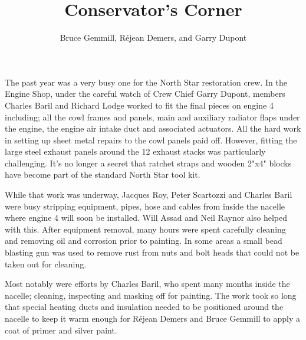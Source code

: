 %


\title{Conservator's Corner}
\author{Bruce Gemmill, R\'{e}jean Demers, and Garry Dupont}

\maketitle


The past year was a very busy one for the North Star restoration crew. 
In the Engine Shop, under the careful watch of Crew Chief Garry Dupont,
members Charles Baril and Richard Lodge worked to fit the final pieces
on engine 4 including; all the cowl frames and panels, main and
auxiliary radiator flaps under the engine, the engine air intake duct
and associated actuators. All the hard work in setting up sheet metal
repairs to the cowl panels paid off.  However, fitting the large steel
exhaust panels around the 12 exhaust stacks was particularly
challenging. It's no longer a secret that ratchet straps and wooden
2"x4" blocks have become part of the standard North Star tool kit.

While that work was underway, Jacques Roy, Peter Scartozzi and Charles
Baril were busy stripping equipment, pipes, hose and cables from inside
the nacelle where engine 4 will soon be installed.  Will Assad and Neil
Raynor also helped with this. After equipment removal, many hours were
spent carefully cleaning and removing oil and corrosion prior to
painting.  In some areas a small bead blasting gun was used to remove
rust from nuts and bolt heads that could not be taken out for cleaning.

Most notably were efforts by Charles Baril, who spent many months
inside the nacelle; cleaning, inspecting and masking off for painting.
The work took so long that special heating ducts and insulation needed
to be positioned around the nacelle to keep it warm enough for R\'{e}jean
Demers and Bruce Gemmill to apply a coat of primer and silver paint.

